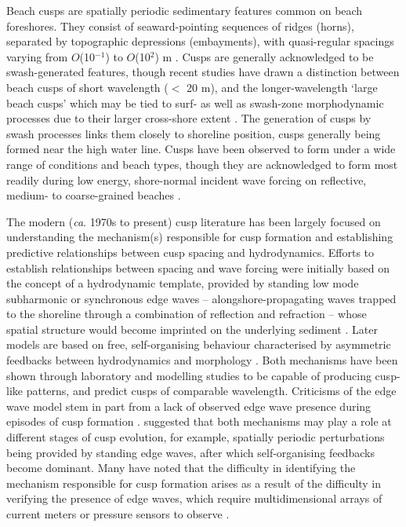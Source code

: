 Beach cusps are spatially periodic sedimentary features common on beach foreshores. They consist of seaward-pointing sequences of ridges (horns), separated by topographic depressions (embayments), with quasi-regular spacings varying from $O$(10$^{-1}$) to $O$(10$^{2}$) m \citep{Coco_etal1999}. Cusps are generally acknowledged to be swash-generated features, though recent studies have drawn a distinction between beach cusps of short wavelength ($<$ 20 m), and the longer-wavelength `large beach cusps' which may be tied to surf- as well as swash-zone morphodynamic processes due to their larger cross-shore extent \citep{Garnier_etal2010}. The generation of cusps by swash processes links them closely to shoreline position, cusps generally being formed near the high water line. Cusps have been observed to form under a wide range of conditions and beach types, though they are acknowledged to form most readily during low energy, shore-normal incident wave forcing on reflective, medium- to coarse-grained beaches \citep{Holland1998}. 

The modern (\textit{ca}. 1970s to present) cusp literature has been largely focused on understanding the mechanism(s) responsible for cusp formation and establishing predictive relationships between cusp spacing and hydrodynamics. Efforts to establish relationships between spacing and wave forcing were initially based on the concept of a hydrodynamic template, provided by standing low mode subharmonic or synchronous edge waves -- alongshore-propagating waves trapped to the shoreline through a combination of reflection and refraction -- whose spatial structure would become imprinted on the underlying sediment \citep{Guza_Inman1975, Guza_Bowen1981, Holman_Bowen1982}. Later models are based on free, self-organising behaviour characterised by asymmetric feedbacks between hydrodynamics and morphology \citep{Werner_Fink1993, Coco_etal2000, Coco_etal2004, Sunamura2004, Dodd_etal2008}. Both mechanisms have been shown through laboratory and modelling studies to be capable of producing cusp-like patterns, and predict cusps of comparable wavelength. Criticisms of the edge wave model stem in part from a lack of observed edge wave presence during episodes of cusp formation \citep[e.g.,][]{Holland_Holman1996, Masselink1997}. \citet{Ciriano_etal2005} suggested that both mechanisms may play a role at different stages of cusp evolution, for example, spatially periodic perturbations being provided by standing edge waves, after which self-organising feedbacks become dominant. Many have noted that the difficulty in identifying the mechanism responsible for cusp formation arises as a result of the difficulty in verifying the presence of edge waves, which require multidimensional arrays of current meters or pressure sensors to observe \citep[e.g.,][]{Coco_etal1999}. 

